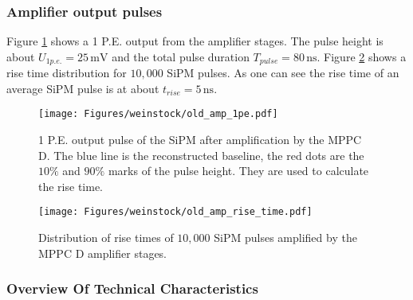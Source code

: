 \documentclass[]{article}
\begin{document}
\subsubsection*{Amplifier output pulses}

Figure \ref{fig:sipm_pulse_old} shows a 1 P.E. output from the amplifier stages. The pulse height is about $U_{1p.e.} = 25\,\text{mV}$ and the total pulse duration $T_{pulse} = 80\,\text{ns}$. Figure \ref{fig:rise_time_old} shows a rise time distribution for $10,000$ SiPM pulses. As one can see the rise time of an average SiPM pulse is at about $t_{rise} = 5\,\text{ns}$.

	\begin{figure}[t]
		\centering
			\texttt{[image: Figures/weinstock/old\_amp\_1pe.pdf]}
		\caption{1 P.E. output pulse of the SiPM after amplification by the MPPC D. The blue line is the reconstructed baseline, the red dots are the $10\%$ and $90 \%$ marks of the pulse height. They are used to calculate the rise time.}
		\label{fig:sipm_pulse_old}
	\end{figure}
	
	\begin{figure}[t]
		\centering
			\texttt{[image: Figures/weinstock/old\_amp\_rise\_time.pdf]}
		\caption{Distribution of rise times of $10,000$ SiPM pulses amplified by the MPPC D amplifier stages.}
		\label{fig:rise_time_old}
	\end{figure}	

\subsubsection{Overview Of Technical Characteristics}
\end{document}
